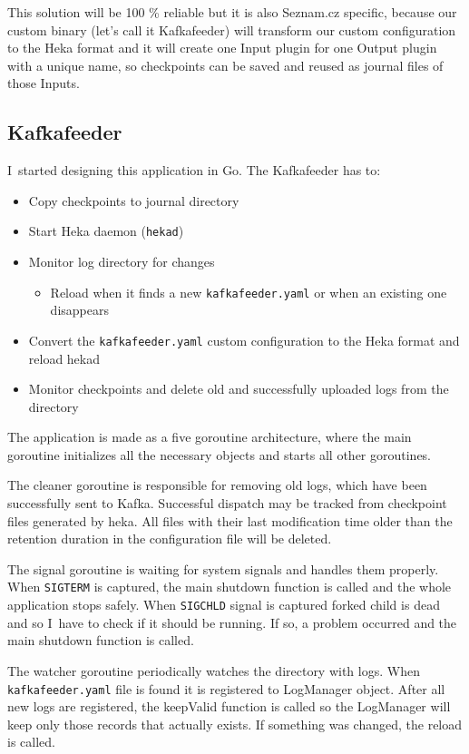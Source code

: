 This solution will be 100 \% reliable but it is also Seznam.cz specific, because our custom binary (let’s call it Kafkafeeder) will transform our custom configuration to the Heka format  and it will create one Input plugin for one Output plugin with a unique name, so checkpoints can be saved and reused as journal files of those Inputs.
 
\subsection{Kafkafeeder}
I~started designing this application in Go. The Kafkafeeder has to:
\begin{itemize} 
  \item	Copy checkpoints to journal directory
  \item	Start Heka daemon (\lstinline{hekad})
  \item	Monitor log directory for changes
    \begin{itemize}
      \item Reload when it finds a new \lstinline{kafkafeeder.yaml} or when an existing one disappears
    \end{itemize}
  \item	Convert the \lstinline{kafkafeeder.yaml} custom configuration to the Heka format and reload hekad 
  \item	Monitor checkpoints and delete old and successfully uploaded logs from the directory
\end{itemize}

The application is made as a five goroutine architecture, where the main goroutine initializes all the necessary objects and starts all other goroutines.

The cleaner goroutine is responsible for removing old logs, which have been successfully sent to Kafka. Successful dispatch may be tracked from checkpoint files generated by heka. All files with their last modification time older than the retention duration in the configuration file will be deleted.

The signal goroutine is waiting for system signals and handles them properly. When \lstinline{SIGTERM} is captured, the main shutdown function is called and the whole application stops safely. When \lstinline{SIGCHLD} signal is captured forked child is dead and so I~have to check if it should be running. If so, a problem occurred and the main shutdown function is called.

The watcher goroutine periodically watches the directory with logs. When \lstinline{kafkafeeder.yaml} file is found it is registered to LogManager object. After all new logs are registered, the keepValid function is called so the LogManager will keep only those records that actually exists. If something was changed, the reload is called.

